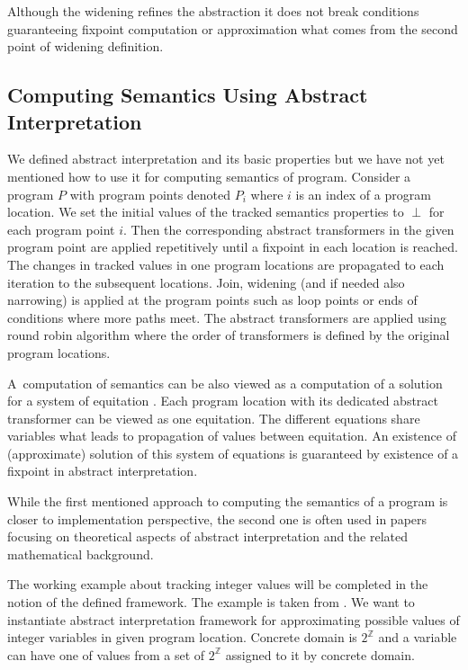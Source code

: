 \documentclass[a4paper, 12pt]{article}
\newcommand{\ainf}[0]{\perp}
\newcommand{\intg}[0]{\mathbb{Z}}
\begin{document}
Although the widening refines the abstraction it does not
break conditions guaranteeing fixpoint computation or approximation
what comes from the second point of widening definition.

\subsection{Computing Semantics Using Abstract Interpretation}

We defined abstract interpretation and its basic properties
but we have not yet mentioned how to use it for computing
semantics of program.
Consider a program $P$ with program points denoted $P_i$
where $i$ is an index of a program location.
We set the initial values of the tracked semantics properties
to $\ainf$ for each program point $i$.
Then the corresponding abstract transformers in the given program point
are applied repetitively until a fixpoint in each location is reached.
The changes in tracked values in one program locations are propagated to each
iteration to the subsequent locations.
Join, widening (and if needed also narrowing) is applied at the program points
such as loop points or ends of conditions where more paths meet.
The abstract transformers are applied using round robin algorithm where
the order of transformers is defined by the original program locations.

A~computation of semantics can be also viewed as a computation of
a solution for a system of equitation \cite{cousot81}.
Each program location with its dedicated abstract transformer can be viewed
as one equitation.
The different equations share variables what leads to propagation
of values between equitation.
An existence of (approximate) solution of this system of equations
is guaranteed by existence of a fixpoint in abstract interpretation.

While the first mentioned approach to computing the semantics of a program is
closer to implementation perspective, the second one is often used in papers
focusing on theoretical aspects of abstract interpretation and
the related mathematical background.

\bexmp
The working example about tracking integer values will be completed
in the notion of the defined framework.
The example is taken from \cite{popl77}.
We want to instantiate abstract interpretation framework for approximating
possible values of integer variables in given program location.
Concrete domain is $2^\mathbb{\intg}$ and a variable can have one of values
from a set of $2^\mathbb{\intg}$ assigned to it by concrete domain.
\end{document}

